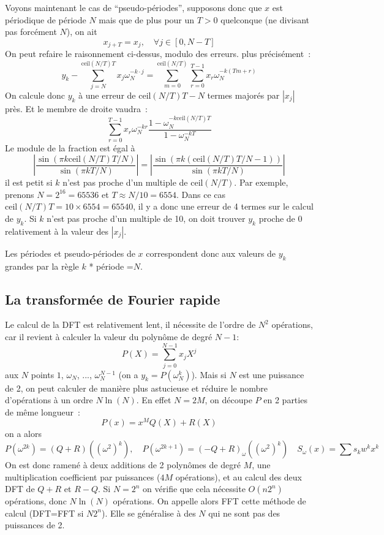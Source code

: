 \documentclass[a4paper,11pt]{article}
\begin{document}
Voyons maintenant le cas de ``pseudo-périodes'', supposons donc
que $x$ est périodique de période $N$ mais que de plus pour un $T>0$ 
quelconque (ne divisant pas forcément $N$), on ait
\[ x_{j+T}=x_j, \quad \forall j \in[0,N-T] \]
On peut refaire le raisonnement ci-dessus, modulo des erreurs.
plus précisément~:
\[ y_k - \sum_{j=N}^{\mbox{ceil}(N/T)T}x_j \omega_N^{-k\cdot j} 
= \sum_{m=0}^{\mbox{ceil}(N/T)} \sum_{r=0}^{T-1} x_r \omega_N^{-k (T m+r)} \]
On calcule donc $y_k$ à une erreur de $\mbox{ceil}(N/T)T-N$ termes majorés
par $|x_j|$ près.
Et le membre de droite vaudra~:
\[ \sum_{r=0}^{T-1} x_r \omega_N^{-kr} 
\frac{1-\omega_N^{-k\mbox{ceil}(N/T) T}}{1-\omega_N^{-kT}}
\]
Le module de la fraction est égal à
\[ |\frac{\sin(\pi k \mbox{ceil}(N/T) T/N)}{\sin(\pi k T/N)} |
= |\frac{\sin(\pi k (\mbox{ceil}(N/T) T/N-1))}{\sin(\pi k T/N)} |
\]
il est petit si $k$ n'est pas proche d'un multiple de $\mbox{ceil}(N/T)$.
Par exemple, prenons $N=2^16=65536$ et $T \approx N/10 =6554$. Dans
ce cas $\mbox{ceil}(N/T)T=10 \times 6554=65540$, il y a donc une erreur
de 4 termes sur le calcul de $y_k$. Si $k$ n'est pas proche d'un multiple
de 10, on doit trouver $y_k$ proche de 0 relativement à la valeur des $|x_j|$.

Les périodes et pseudo-périodes de $x$ correspondent donc aux
valeurs de $y_k$ grandes par la règle $k$ * période =$N$.

\subsection{La transformée de Fourier rapide}
Le calcul de la DFT est relativement lent, il nécessite de l'ordre
de $N^2$ opérations, car il revient à calculer la valeur du polynôme
de degré $N-1$:
\[ P(X)=\sum_{j=0}^{N-1} x_j X^j \]
aux $N$ points $1$, $\omega_N$, ..., $\omega_N^{N-1}$ 
(on a $y_k=P(\omega_N^k)$).
Mais si $N$ est une puissance de 2, on peut calculer de manière plus
astucieuse et réduire le nombre d'opérations à un ordre $N \ln(N)$.
En effet $N=2M$,
on d\'ecoupe $P$ en 2 parties de m\^eme longueur~:
\[ P(x)=x^M Q(X) + R(X) \]
on a alors
\[ P(\omega^{2k})= (Q+R) ((\omega^2)^{k}), \quad
P(\omega^{2k+1})= (-Q +R)_\omega ((\omega^2)^k) \quad
S_\omega(x)=\sum s_k w^k x^k
\]
On est donc ramen\'e \`a deux additions de 2 polyn\^omes de degr\'e $M$,
une multiplication coefficient par puissances ($4M$ op\'erations),
et au calcul des deux DFT de $Q+R$ et $R-Q$. Si $N=2^n$ on
v\'erifie que cela n\'ecessite $O(n2^n)$ op\'erations, donc $N\ln(N)$
opérations.
On appelle alors FFT cette méthode de calcul (DFT=FFT si $N2^n$).
Elle se g\'en\'eralise \`a des $N$ qui ne sont pas des puissances
de 2.
\end{document}
